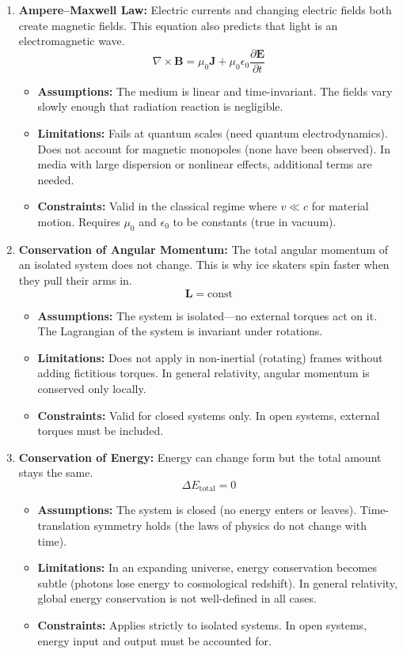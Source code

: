 \documentclass[11pt,openright]{book}
\begin{document}
\begin{enumerate}

\item \textbf{Ampere--Maxwell Law:} Electric currents and changing electric fields both create magnetic fields. This equation also predicts that light is an electromagnetic wave.
\[
\nabla\times\mathbf B=\mu_0\mathbf J+\mu_0\epsilon_0\frac{\partial\mathbf E}{\partial t}
\]
\begin{itemize}
\item \textbf{Assumptions:} The medium is linear and time-invariant. The fields vary slowly enough that radiation reaction is negligible.
\item \textbf{Limitations:} Fails at quantum scales (need quantum electrodynamics). Does not account for magnetic monopoles (none have been observed). In media with large dispersion or nonlinear effects, additional terms are needed.
\item \textbf{Constraints:} Valid in the classical regime where $v\ll c$ for material motion. Requires $\mu_0$ and $\epsilon_0$ to be constants (true in vacuum).
\end{itemize}

\item \textbf{Conservation of Angular Momentum:} The total angular momentum of an isolated system does not change. This is why ice skaters spin faster when they pull their arms in.
\[
\mathbf L=\text{const}
\]
\begin{itemize}
\item \textbf{Assumptions:} The system is isolated---no external torques act on it. The Lagrangian of the system is invariant under rotations.
\item \textbf{Limitations:} Does not apply in non-inertial (rotating) frames without adding fictitious torques. In general relativity, angular momentum is conserved only locally.
\item \textbf{Constraints:} Valid for closed systems only. In open systems, external torques must be included.
\end{itemize}

\item \textbf{Conservation of Energy:} Energy can change form but the total amount stays the same.
\[
\Delta E_{\text{total}}=0
\]
\begin{itemize}
\item \textbf{Assumptions:} The system is closed (no energy enters or leaves). Time-translation symmetry holds (the laws of physics do not change with time).
\item \textbf{Limitations:} In an expanding universe, energy conservation becomes subtle (photons lose energy to cosmological redshift). In general relativity, global energy conservation is not well-defined in all cases.
\item \textbf{Constraints:} Applies strictly to isolated systems. In open systems, energy input and output must be accounted for.
\end{itemize}


\end{enumerate}
\end{document}
